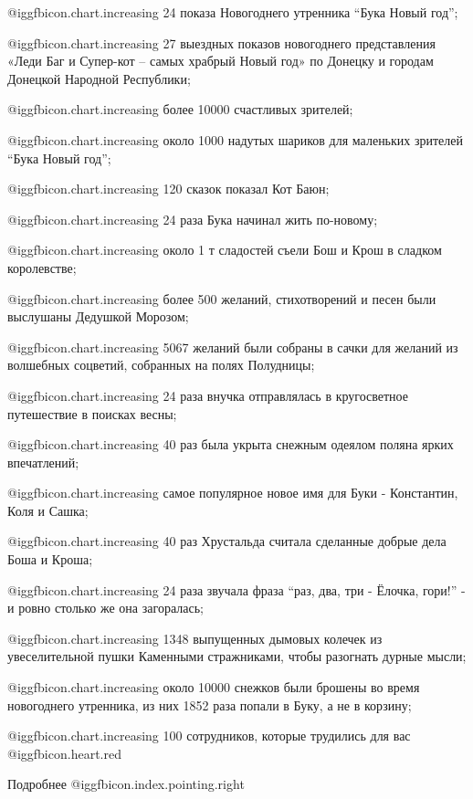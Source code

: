  @igg{fbicon.chart.increasing}  24 показа Новогоднего утренника \enquote{Бука Новый год};

 @igg{fbicon.chart.increasing}  27 выездных показов новогоднего представления «Леди Баг и Супер-кот – самых
храбрый Новый год» по Донецку и городам Донецкой Народной Республики;

 @igg{fbicon.chart.increasing}  более 10000 счастливых зрителей;

 @igg{fbicon.chart.increasing}  около 1000 надутых шариков для маленьких зрителей \enquote{Бука Новый год};

 @igg{fbicon.chart.increasing}  120 сказок показал Кот Баюн;

 @igg{fbicon.chart.increasing}  24 раза Бука начинал жить по-новому;

 @igg{fbicon.chart.increasing}  около 1 т сладостей съели Бош и Крош в сладком королевстве;

 @igg{fbicon.chart.increasing}  более 500 желаний, стихотворений и песен были выслушаны Дедушкой Морозом;

 @igg{fbicon.chart.increasing}  5067 желаний были собраны в сачки для желаний из волшебных соцветий,
собранных на полях Полудницы;

 @igg{fbicon.chart.increasing}  24 раза внучка отправлялась в кругосветное путешествие в поисках весны;

 @igg{fbicon.chart.increasing}  40 раз была укрыта снежным одеялом поляна ярких впечатлений;

 @igg{fbicon.chart.increasing}  самое популярное новое имя для Буки - Константин, Коля и Сашка;

 @igg{fbicon.chart.increasing}  40 раз Хрустальда считала сделанные добрые дела Боша и Кроша;

 @igg{fbicon.chart.increasing}  24 раза звучала фраза \enquote{раз, два, три - Ёлочка, гори!} - и ровно столько же
она загоралась;

 @igg{fbicon.chart.increasing}  1348 выпущенных дымовых колечек из увеселительной пушки Каменными
стражниками, чтобы разогнать дурные мысли;

 @igg{fbicon.chart.increasing}  около 10000 снежков были брошены во время новогоднего утренника, из них 1852
раза попали в Буку, а не в корзину;

 @igg{fbicon.chart.increasing}  100 сотрудников, которые трудились для вас @igg{fbicon.heart.red}

Подробнее  @igg{fbicon.index.pointing.right}  
